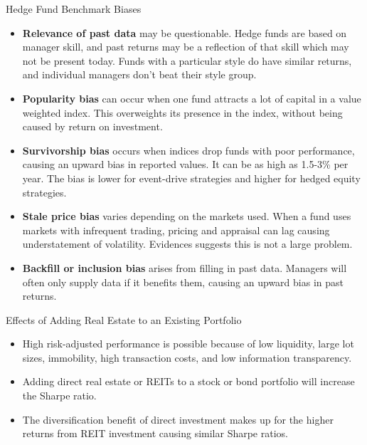 \documentclass[../custom,grid]{flashcards}
\begin{document}
\begin{flashcard}{Hedge Fund Benchmark Biases}
    \begin{itemize}
        \item \textbf{Relevance of past data} may be questionable. Hedge funds are based on manager skill, and past returns may be a reflection of that skill which may not be present today. Funds with a particular style do have similar returns, and individual managers don't beat their style group.
        \item \textbf{Popularity bias} can occur when one fund attracts a lot of capital in a value weighted index. This overweights its presence in the index, without being caused by return on investment.
        \item \textbf{Survivorship bias} occurs when indices drop funds with poor performance, causing an upward bias in reported values. It can be as high as 1.5-3\% per year. The bias is lower for event-drive strategies and higher for hedged equity strategies.
        \item \textbf{Stale price bias} varies depending on the markets used. When a fund uses markets with infrequent trading, pricing and appraisal can lag causing understatement of volatility. Evidences suggests this is not a large problem.
        \item \textbf{Backfill or inclusion bias} arises from filling in past data. Managers will often only supply data if it benefits them, causing an upward bias in past returns.
    \end{itemize}
\end{flashcard}

\begin{flashcard}{Effects of Adding Real Estate to an Existing Portfolio}
    \begin{itemize}
        \item  High risk-adjusted performance is possible because of low liquidity, large lot sizes, immobility, high transaction costs, and low information transparency.
        \item Adding direct real estate or REITs to a stock or bond portfolio will increase the Sharpe ratio.
        \item The diversification benefit of direct investment makes up for the higher returns from REIT investment causing similar Sharpe ratios.
    \end{itemize}
\end{flashcard}
\end{document}

